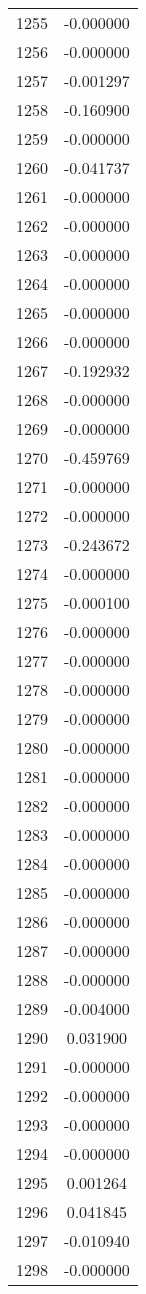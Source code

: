 \documentclass[12pt]{article}
\begin{document}
\begin{longtable}{@{}cc@{}}
1255 & -0.000000 \\
1256 & -0.000000 \\
1257 & -0.001297 \\
1258 & -0.160900 \\
1259 & -0.000000 \\
1260 & -0.041737 \\
1261 & -0.000000 \\
1262 & -0.000000 \\
1263 & -0.000000 \\
1264 & -0.000000 \\
1265 & -0.000000 \\
1266 & -0.000000 \\
1267 & -0.192932 \\
1268 & -0.000000 \\
1269 & -0.000000 \\
1270 & -0.459769 \\
1271 & -0.000000 \\
1272 & -0.000000 \\
1273 & -0.243672 \\
1274 & -0.000000 \\
1275 & -0.000100 \\
1276 & -0.000000 \\
1277 & -0.000000 \\
1278 & -0.000000 \\
1279 & -0.000000 \\
1280 & -0.000000 \\
1281 & -0.000000 \\
1282 & -0.000000 \\
1283 & -0.000000 \\
1284 & -0.000000 \\
1285 & -0.000000 \\
1286 & -0.000000 \\
1287 & -0.000000 \\
1288 & -0.000000 \\
1289 & -0.004000 \\
1290 & 0.031900 \\
1291 & -0.000000 \\
1292 & -0.000000 \\
1293 & -0.000000 \\
1294 & -0.000000 \\
1295 & 0.001264 \\
1296 & 0.041845 \\
1297 & -0.010940 \\
1298 & -0.000000 \\

\end{longtable}
\end{document}
